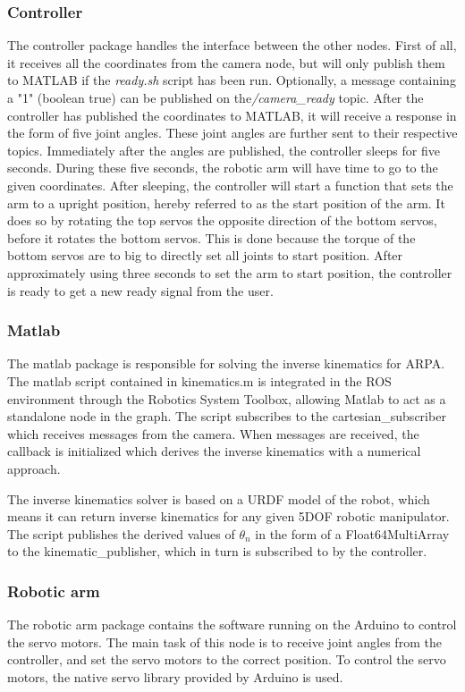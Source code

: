 \documentclass[11pt,a4paper, titlepage]{article}
\begin{document}
\subsubsection{Controller}
The controller package handles the interface between the other nodes. First of all, it receives all the coordinates from the camera node, but will only publish them to MATLAB if the \textit{ready.sh} script has been run. Optionally, a message containing a  "1" (boolean true) can be published on the\textit{/camera\_ready} topic. After the controller has published the coordinates to MATLAB, it will receive a response in the form of five joint angles. These joint angles are further sent to their respective topics. Immediately after the angles are published, the controller sleeps for five seconds. During these five seconds, the robotic arm will have time to go to the given coordinates. After sleeping, the controller will start a function that sets the arm to a upright position, hereby referred to as the start position of the arm. It does so by rotating the top servos the opposite direction of the bottom servos, before it rotates the bottom servos. This is done because the torque of the bottom servos are to big to directly set all joints to start position. After approximately using three seconds to set the arm to start position, the controller is ready to get a new ready signal from the user.

\subsubsection{Matlab}
The matlab package is responsible for solving the inverse kinematics for ARPA. The matlab script contained in kinematics.m is integrated in the ROS environment through the Robotics System Toolbox, allowing Matlab to act as a standalone node in the graph. The script subscribes to the cartesian\_subscriber which receives messages from the camera. When messages are received, the callback is initialized which derives the inverse kinematics with a numerical approach.

The inverse kinematics solver is based on a URDF model of the robot, which means it can return inverse kinematics for any given 5DOF robotic manipulator. The script publishes the derived values of $\theta_n$ in the form of a Float64MultiArray to the kinematic\_publisher, which in turn is subscribed to by the controller.

\newpage
\subsubsection{Robotic arm}
The robotic arm package contains the software running on the Arduino to control the servo motors. The main task of this node is to receive joint angles from the controller, and set the servo motors to the correct position. To control the servo motors, the native servo library provided by Arduino is used.
\end{document}
